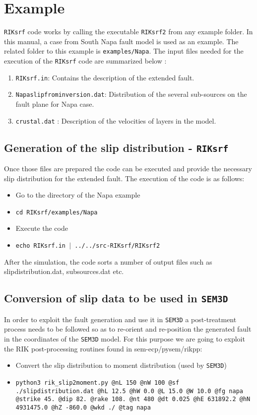 \section{Example}


\texttt{RIKsrf} code works by calling the executable \texttt{RIKsrf2} from any example folder. In this manual, a case from South Napa fault model is used as an example. The related folder to this example is \texttt{examples/Napa}. The input files needed for the execution of the \texttt{RIKsrf} code are summarized below :
\begin{enumerate}
    \item \texttt{RIKsrf.in}: Contains the description of the extended fault.
    \item \texttt{Napaslipfrominversion.dat}: Distribution of the several sub-sources on the fault plane for Napa case.
    \item \texttt{crustal.dat} : Description of the velocities of layers in the model.
\end{enumerate} 

\subsection{Generation of the slip distribution - \texttt{RIKsrf}}
Once those files are prepared the code can be executed and provide the necessary slip distribution for the extended fault. The execution of the code is as follows:
\begin{itemize}
    \item Go to the directory of the Napa example
    \item[] \texttt{cd \texttt{RIKsrf}/examples/Napa}
    \item Execute the code
    \item[] \texttt{echo RIKsrf.in $|$ ../../src-RIKsrf/RIKsrf2}
\end{itemize}

After the simulation, the code sorts a number of output files such as slipdistribution.dat, subsources.dat etc. 

\subsection{Conversion of slip data to be used in \texttt{SEM3D}}
In order to exploit the fault generation and use it in \texttt{SEM3D} a post-treatment process needs to be followed so as to re-orient and re-position the generated fault in the coordinates of the \texttt{SEM3D} model. For this purpose we are going to exploit the RIK post-processing routines found in sem-ecp/pysem/rikpp:
\begin{itemize}
    \item Convert the slip distribution to moment distribution (used by \texttt{SEM3D})
    \item[] \texttt{python3 rik\_slip2moment.py @nL 150 @nW 100 @sf ./slipdistribution.dat @hL 12.5 @hW 0.0 @L 15.0 @W 10.0 @fg napa @strike 45. @dip 82. @rake 108. @nt 480 @dt 0.025 @hE 631892.2 @hN 4931475.0 @hZ -860.0 @wkd ./ @tag napa}
\end{itemize}

